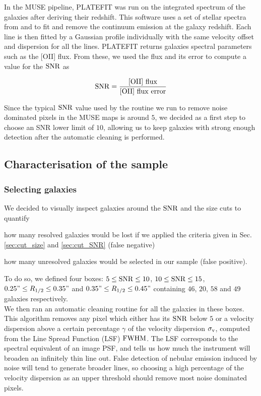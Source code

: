 In the MUSE pipeline, \textsc{PLATEFIT}  was run on the integrated spectrum of the galaxies after deriving their redshift. This software uses a set of stellar spectra from  and  to fit and remove the continuum emission at the galaxy redshift. Each line is then fitted by a Gaussian profile individually with the same velocity offset and dispersion for all the lines. \textsc{PLATEFIT} returns galaxies spectral parameters such as the [OII] flux. From these, we used the flux and its error to compute a value for the $\rm{SNR}$ as

\begin{equation}
	\rm{SNR} = \frac{\rm{[OII] \,\, flux}}{\rm{[OII] \,\, flux \,\, error}}
\end{equation}

Since the typical $\rm{SNR}$ value used by the routine we run to remove noise dominated pixels in the MUSE maps is around $5$, we decided as a first step to choose an SNR lower limit of $10$, allowing us to keep galaxies with strong enough detection after the automatic cleaning is performed.


\subsection{Characterisation of the sample}
\label{sec:sample_characterisation}

\subsubsection{Selecting galaxies}
\label{sec:selecting_galaxies}

We decided to visually inspect galaxies around the $\rm{SNR}$ and the size cuts to quantify
\begin{enumerate*}[label={(\alph*)}]
	\item how many resolved galaxies would be lost if we applied the criteria given in Sec.\,\ref{sec:cut_size} and \ref{sec:cut_SNR} (false negative)
	\item how many unresolved galaxies would be selected in our sample (false positive).
\end{enumerate*}
To do so, we defined four boxes: $5 \leq \rm{SNR} \leq 10$, $10 \le \rm{SNR} \leq 15$, $0.25" \leq R_{1/2} \leq 0.35"$ and $0.35" \le R_{1/2} \leq 0.45"$ containing $46$, $20$, $58$ and $49$ galaxies respectively. \\

We then ran an automatic cleaning routine for all the galaxies in these boxes. This algorithm removes any pixel which either has its $\rm{SNR}$ below $5$ or a velocity dispersion above a certain percentage $\gamma$ of the velocity dispersion $\sigma_{\rm{v}}$, computed from the Line Spread Function (LSF) $\rm{FWHM}$. The LSF corresponds to the spectral equivalent of an image PSF, and tells us how much the instrument will broaden an infinitely thin line out. False detection of nebular emission induced by noise will tend to generate broader lines, so choosing a high percentage of the velocity dispersion as an upper threshold should remove most noise dominated pixels. 

